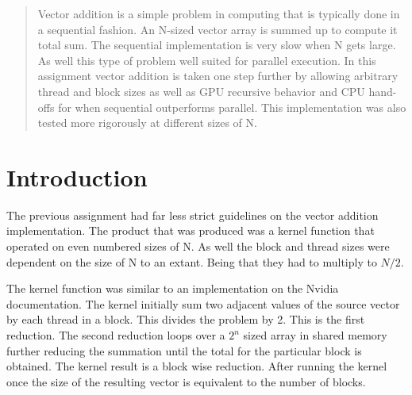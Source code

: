 \documentclass[conference]{IEEEtran}
\begin{document}
\begin{abstract}
Vector addition is a simple problem in computing that is typically done in a sequential fashion. An N-sized vector array is summed up to compute it total sum. The sequential implementation is very slow when N gets large. As well this type of problem well suited for parallel execution. In this assignment vector addition is taken one step further by allowing arbitrary thread and block sizes as well as GPU recursive behavior and CPU hand-offs for when sequential outperforms parallel. This implementation was also tested more rigorously at different sizes of N.
\end{abstract}





%
\IEEEpeerreviewmaketitle



\section{Introduction}
The previous assignment had far less strict guidelines on the vector addition implementation. The product that was produced was a kernel function that operated on even numbered sizes of N. As well the block and thread sizes were dependent on the size of N to an extant. Being that they had to multiply to $N/2$.

The kernel function was similar to an implementation on the Nvidia documentation. The kernel initially sum two adjacent values of the source vector by each thread in a block. This divides the problem by 2. This is the first reduction. The second reduction loops over a $2^n$ sized array in shared memory further reducing the summation until the total for the particular block is obtained. The kernel result is a block wise reduction. After running the kernel once the size of the resulting vector is equivalent to the number of blocks.
\end{document}
